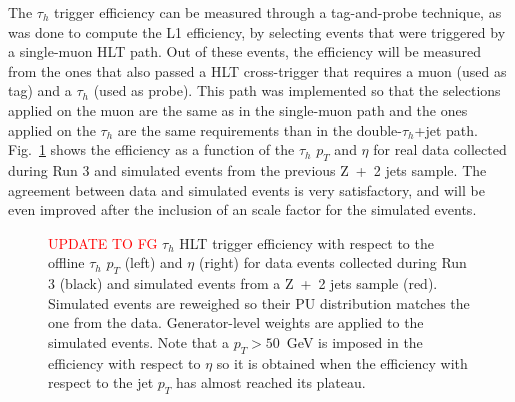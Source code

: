 \documentclass[../main.tex]{subfiles}
\begin{document}
The $\tau_h$ trigger efficiency can be measured through a tag-and-probe technique, as was done to compute the L1 efficiency, by selecting events that were triggered by a single-muon HLT path. Out of these events, the efficiency will be measured from the ones that also passed a HLT cross-trigger that requires a muon (used as tag) and a $\tau_h$ (used as probe). This path was implemented so that the selections applied on the muon are the same as in the single-muon path and the ones applied on the $\tau_h$ are the same requirements than in the double-$\tau_h$+jet path. Fig.~\ref{hh:fig:hlt_eff_tau} shows the efficiency as a function of the $\tau_h$ $p_T$ and $\eta$ for real data collected during Run 3 and simulated events from the previous Z~+~2 jets sample. The agreement between data and simulated events is very satisfactory, and will be even improved after the inclusion of an scale factor for the simulated events.

\begin{figure}[h!]
\begin{center}
\end{center}
\caption{\textcolor{red}{UPDATE TO FG} $\tau_h$ HLT trigger efficiency with respect to the offline $\tau_h$ $p_T$ (left) and $\eta$ (right) for data events collected during Run 3 (black) and simulated events from a Z~+~2 jets sample (red). Simulated events are reweighed so their PU distribution matches the one from the data. Generator-level weights are applied to the simulated events. Note that a $p_T>50$~GeV is imposed in the efficiency with respect to $\eta$ so it is obtained when the efficiency with respect to the jet $p_T$ has almost reached its plateau.}
\label{hh:fig:hlt_eff_tau}
\end{figure}
\end{document}
